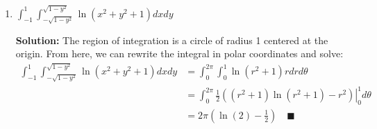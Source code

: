 \documentclass[letterpaper, 11pt]{article}
\begin{document}
\begin{enumerate}
\begin{enumerate}[label=(\alph*)]
\item $\int_{-1}^1 \int_{-\sqrt{1 - y^2}}^{\sqrt{1 - y^2}} \ln(x^2 + y^2 + 1)dx dy$
\par \textbf{Solution:} The region of integration is a circle of radius 1 centered at the origin. From here, we can rewrite the integral in polar coordinates and solve:
\begin{align*}
\int_{-1}^1 \int_{-\sqrt{1 - y^2}}^{\sqrt{1 - y^2}} \ln(x^2 + y^2 + 1)dx dy &= \int_0^{2\pi} \int_0^1  \ln(r^2 + 1) r dr d\theta \\
&= \int_0^{2\pi} \left. \frac{1}{2}((r^2 + 1) \ln(r^2 + 1) - r^2 ) \right|_0^1 d\theta \\
&= 2 \pi \left( \ln(2) - \frac{1}{2} \right) \quad\blacksquare 
\end{align*}


\end{enumerate}

\end{enumerate}
\end{document}
